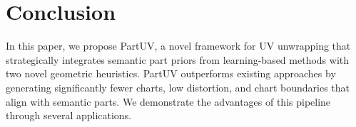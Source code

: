 \vspace{1.5ex}
\section{Conclusion}
\vspace{-0.3em}

In this paper, we propose PartUV, a novel framework for UV unwrapping that strategically integrates semantic part priors from learning-based methods with two novel geometric heuristics. PartUV outperforms existing approaches by generating significantly fewer charts, low distortion, and chart boundaries that align with semantic parts. We demonstrate the advantages of this pipeline through several applications.